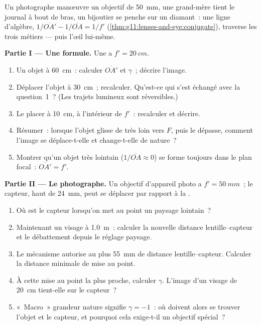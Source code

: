 \begin{problem}
\label{pb:g11:lenses-and-eye:1}
Un photographe manœuvre un objectif de \qty{50}{mm}, une grand-mère
tient le journal à bout de bras, un bijoutier se penche sur un diamant~:
une ligne d'algèbre, $1/\overline{OA'} - 1/\overline{OA} = 1/f'$
(\cref{thm:g11:lenses-and-eye:conjugate}), traverse les trois métiers ---
puis l'œil lui-même.

\medskip
\noindent\textbf{Partie I --- Une formule.} Une
 a $f' = \qty{20}{cm}$.
\begin{enumerate}
  \item Un objet à \qty{60}{cm}~: calculer $\overline{OA'}$ et
        $\gamma$~; décrire l'image.
  \item Déplacer l'objet à \qty{30}{cm}~; recalculer. Qu'est-ce qui
        s'est échangé avec la question~1~? (Les trajets lumineux sont
        réversibles.)
  \item Le placer à \qty{10}{cm}, à l'intérieur de $f'$~: recalculer et
        décrire.
  \item Résumer~: lorsque l'objet glisse de très loin vers $F$, puis
        le dépasse, comment l'image se déplace-t-elle et change-t-elle
        de nature~?
  \item Montrer qu'un objet très lointain ($1/\overline{OA} \approx 0$)
        se forme toujours dans le plan focal~: $\overline{OA'} = f'$.
\end{enumerate}

\medskip
\noindent\textbf{Partie II --- Le photographe.}
Un objectif d'appareil photo a $f' = \qty{50}{mm}$~; le capteur, haut
de \qty{24}{mm}, peut se déplacer par rapport à la
.
\begin{enumerate}[resume]
  \item Où est le capteur lorsqu'on met au point un paysage lointain~?
  \item Maintenant un visage à \qty{1.0}{m}~: calculer la nouvelle
        distance lentille--capteur et le débattement depuis le réglage
        paysage.
  \item Le mécanisme autorise au plus \qty{55}{mm} de distance
        lentille--capteur. Calculer la distance minimale de mise au
        point.
  \item À cette mise au point la plus proche, calculer $\gamma$.
        L'image d'un visage de \qty{20}{cm} tient-elle sur le capteur~?
  \item «~Macro~» grandeur nature signifie $\gamma = -1$~: où doivent
        alors se trouver l'objet et le capteur, et pourquoi cela
        exige-t-il un objectif spécial~?
\end{enumerate}


\end{problem}
